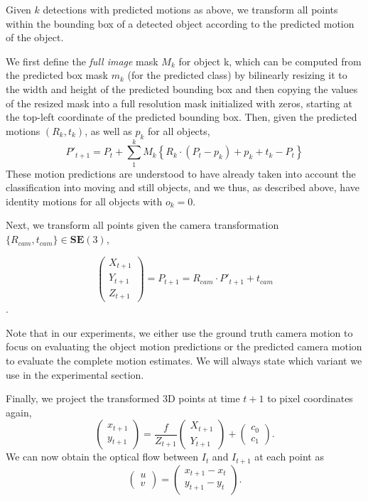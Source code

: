 Given $k$ detections with predicted motions as above, we transform all points within the bounding
box of a detected object according to the predicted motion of the object.

We first define the \emph{full image} mask $M_k$ for object k,
which can be computed from the predicted box mask $m_k$ (for the predicted class) by bilinearly resizing
it to the width and height of the predicted bounding box and then copying the values
of the resized mask into a full resolution mask initialized with zeros,
starting at the top-left coordinate of the predicted bounding box.
Then, given the predicted motions $(R_k, t_k)$, as well as $p_k$ for all objects,
\begin{equation}
P'_{t+1} =
P_t + \sum_1^{k} M_k\left\{ R_k \cdot (P_t - p_k) + p_k + t_k - P_t \right\}
\end{equation}
These motion predictions are understood to have already taken into account
the classification into moving and still objects,
and we thus, as described above, have identity motions for all objects with $o_k = 0$.

Next, we transform all points given the camera transformation $\{R_{cam}, t_{cam}\} \in \mathbf{SE}(3)$,

\begin{equation}
\begin{pmatrix}
X_{t+1} \\ Y_{t+1} \\ Z_{t+1}
\end{pmatrix}
= P_{t+1} = R_{cam} \cdot P'_{t+1} + t_{cam}
\end{equation}.

Note that in our experiments, we either use the ground truth camera motion to focus
on evaluating the object motion predictions or the predicted camera motion to evaluate
the complete motion estimates. We will always state which variant we use in the experimental section.

Finally, we project the transformed 3D points at time $t+1$ to pixel coordinates again,
\begin{equation}
\begin{pmatrix}
x_{t+1} \\ y_{t+1}
\end{pmatrix}
=
\frac{f}{Z_{t+1}}
\begin{pmatrix}
X_{t+1} \\ Y_{t+1}
\end{pmatrix}
+
\begin{pmatrix}
c_0 \\ c_1
\end{pmatrix}.
\end{equation}
We can now obtain the optical flow between $I_t$ and $I_{t+1}$ at each point as
\begin{equation}
\begin{pmatrix}
u \\ v
\end{pmatrix}
=
\begin{pmatrix}
x_{t+1} - x_{t} \\ y_{t+1} - y_{t}
\end{pmatrix}.
\end{equation}
